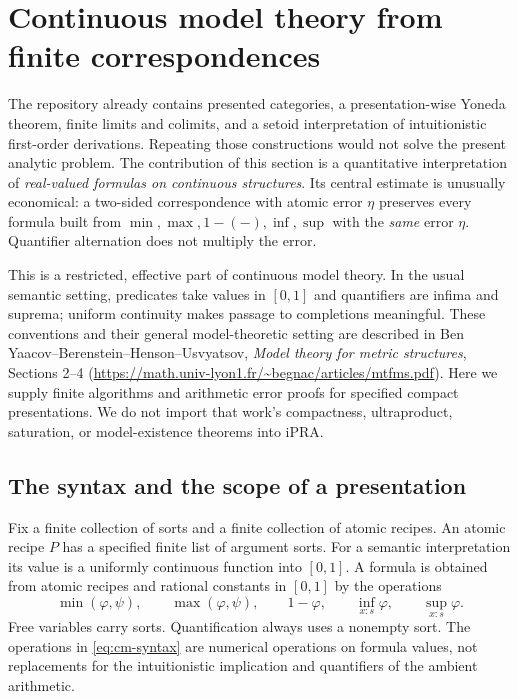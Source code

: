 \providecommand{\val}[1]{\lVert #1\rVert}
\providecommand{\qval}{\operatorname{qval}}
\providecommand{\Amp}{\operatorname{Amp}}
\providecommand{\CM}{\mathcal M}
\providecommand{\CN}{\mathcal N}
\section{Continuous model theory from finite correspondences}
\label{sec:continuous-models}

The repository already contains presented categories, a presentation-wise
Yoneda theorem, finite limits and colimits, and a setoid interpretation of
intuitionistic first-order derivations. Repeating those constructions would
not solve the present analytic problem. The contribution of this section is
a quantitative interpretation of \emph{real-valued formulas on continuous
structures}. Its central estimate is unusually economical: a two-sided
correspondence with atomic error $\eta$ preserves every formula built from
$\min,\max,1-(-),\inf,\sup$ with the \emph{same} error $\eta$.
Quantifier alternation does not multiply the error.

This is a restricted, effective part of continuous model theory. In the usual
semantic setting, predicates take values in $[0,1]$ and quantifiers are
infima and suprema; uniform continuity makes passage to completions
meaningful. These conventions and their general model-theoretic setting
are described in Ben Yaacov--Berenstein--Henson--Usvyatsov,
\emph{Model theory for metric structures}, Sections 2--4
(\url{https://math.univ-lyon1.fr/~begnac/articles/mtfms.pdf}).
Here we supply finite algorithms and arithmetic error proofs for specified
compact presentations. We do not import that work's compactness,
ultraproduct, saturation, or model-existence theorems into iPRA.

\subsection{The syntax and the scope of a presentation}

Fix a finite collection of sorts and a finite collection of atomic
recipes. An atomic recipe $P$ has a specified finite list of argument sorts.
For a semantic interpretation its value is a uniformly continuous function
into $[0,1]$. A formula is obtained from atomic recipes and rational constants
in $[0,1]$ by the operations
\begin{equation}
 \min(\varphi,\psi),\qquad
 \max(\varphi,\psi),\qquad
 1-\varphi,\qquad
 \inf_{x:s}\varphi,\qquad
 \sup_{x:s}\varphi .
 \label{eq:cm-syntax}
\end{equation}
Free variables carry sorts. Quantification always uses a nonempty sort.
The operations in \eqref{eq:cm-syntax} are numerical operations on formula
values, not replacements for the intuitionistic implication and
quantifiers of the ambient arithmetic.

